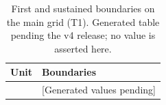 \begin{table}[t]
\caption{First and sustained boundaries on the main grid (T1). Generated table pending the v4 release; no value is asserted here.}\label{tab:v4-T1}
\centering\begin{tabular}{ll}\hline
Unit & Boundaries \\\hline
[Insert generated rows] & [Generated values pending] \\\hline
\end{tabular}
\end{table}
